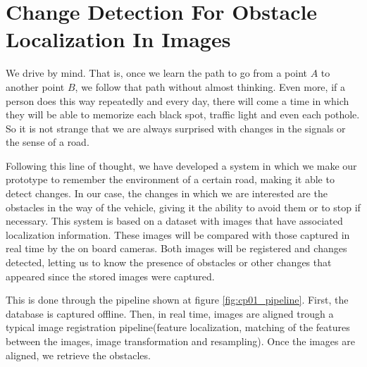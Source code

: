 
\graphicspath{{./images/chapter01/bmps/}{./images/chapter01/vects/}{./images/chapter01/}}

\chapter{Change Detection For Obstacle Localization In Images}\label{ch:chapter01}

We drive by mind. That is, once we learn the path to go from a point $A$ to another point $B$, we follow that path without almost thinking. Even more, if a person does this way repeatedly and every day, there will come a time in which they will be able to memorize each black spot, traffic light and even each pothole. So it is not strange that we are always surprised with changes in the signals or the sense of a road.

Following this line of thought, we have developed a system in which we make our prototype to remember the environment of a certain road, making it able to detect changes. In our case, the changes in which we are interested are the obstacles in the way of the vehicle, giving it the ability to avoid them or to stop if necessary. This system is based on a dataset with images that have associated localization information. These images will be compared with those captured in real time by the on board cameras. Both images will be registered and changes detected, letting us to know the presence of obstacles or other changes that appeared since the stored images were captured.

This is done through the pipeline shown at figure \ref{fig:cp01_pipeline}. First, the database is captured offline. Then, in real time, images are aligned trough a typical image registration pipeline(feature localization, matching of the features between the images, image transformation and resampling). Once the images are aligned, we retrieve the obstacles.

